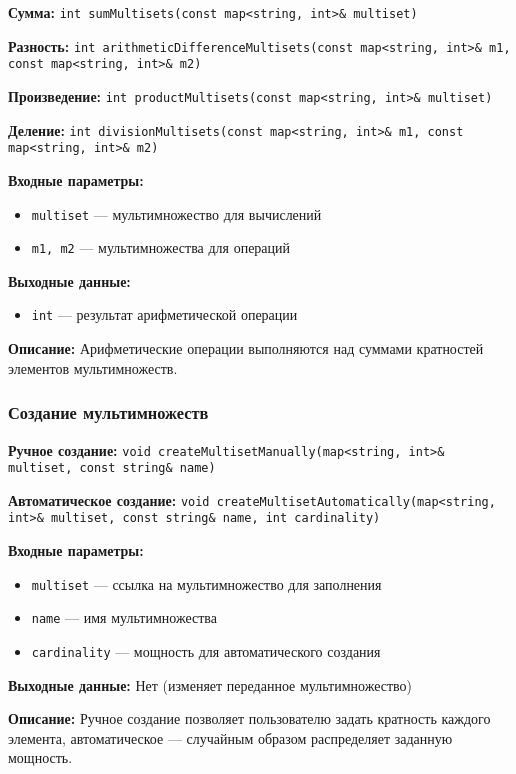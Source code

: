 \documentclass[12pt,a4paper]{article}
\begin{document}
\textbf{Сумма:} \texttt{int sumMultisets(const map<string, int>\& multiset)}

\textbf{Разность:} \texttt{int arithmeticDifferenceMultisets(const map<string, int>\& m1, const map<string, int>\& m2)}

\textbf{Произведение:} \texttt{int productMultisets(const map<string, int>\& multiset)}

\textbf{Деление:} \texttt{int divisionMultisets(const map<string, int>\& m1, const map<string, int>\& m2)}

\textbf{Входные параметры:}
\begin{itemize}
    \item \texttt{multiset} — мультимножество для вычислений
    \item \texttt{m1, m2} — мультимножества для операций
\end{itemize}

\textbf{Выходные данные:}
\begin{itemize}
    \item \texttt{int} — результат арифметической операции
\end{itemize}

\textbf{Описание:} Арифметические операции выполняются над суммами кратностей элементов мультимножеств.

\subsubsection{Создание мультимножеств}

\textbf{Ручное создание:} \texttt{void createMultisetManually(map<string, int>\& multiset, const string\& name)}

\textbf{Автоматическое создание:} \texttt{void createMultisetAutomatically(map<string, int>\& multiset, const string\& name, int cardinality)}

\textbf{Входные параметры:}
\begin{itemize}
    \item \texttt{multiset} — ссылка на мультимножество для заполнения
    \item \texttt{name} — имя мультимножества
    \item \texttt{cardinality} — мощность для автоматического создания
\end{itemize}

\textbf{Выходные данные:} Нет (изменяет переданное мультимножество)

\textbf{Описание:} Ручное создание позволяет пользователю задать кратность каждого элемента, автоматическое — случайным образом распределяет заданную мощность.
\end{document}
